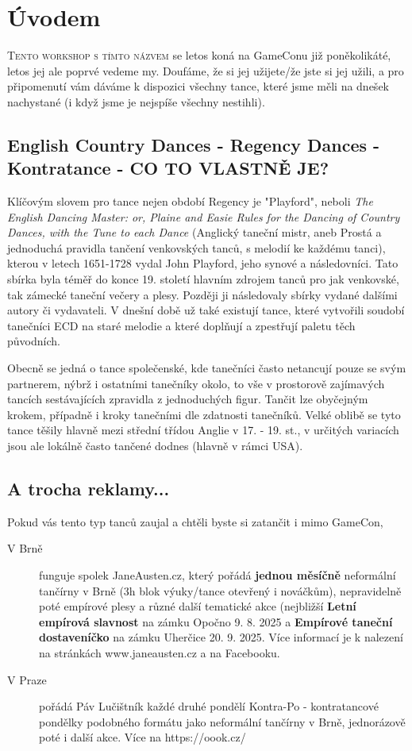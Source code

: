 \chapter{Úvodem}

\lettrine{T}{ento workshop s tímto názvem} se letos koná na GameConu již poněkolikáté, letos jej ale poprvé vedeme my. Doufáme, že si jej užijete/že jste si jej užili, a pro připomenutí vám dáváme k dispozici všechny tance, které jsme měli na dnešek nachystané (i když jsme je nejspíše všechny nestihli).

\section*{English Country Dances - Regency Dances - Kontratance - CO TO VLASTNĚ JE?}

Klíčovým slovem pro tance nejen období Regency je "Playford", neboli \textit{The English Dancing Master: or, Plaine and Easie Rules for the Dancing of Country Dances, with the Tune to each Dance} (Anglický taneční mistr, aneb Prostá a jednoduchá pravidla tančení venkovských tanců, s melodií ke každému tanci), kterou v letech 1651-1728 vydal John Playford, jeho synové a následovníci. Tato sbírka byla téměř do konce 19. století hlavním zdrojem tanců pro jak venkovské, tak zámecké taneční večery a plesy. Později ji následovaly sbírky vydané dalšími autory či vydavateli. V dnešní době už také existují tance, které vytvořili soudobí tanečníci ECD na staré melodie a které doplňují a  zpestřují paletu těch původních.

Obecně se jedná o tance společenské, kde tanečníci často netancují pouze se svým partnerem, nýbrž i ostatními tanečníky okolo, to vše v prostorově zajímavých tancích sestávajících zpravidla z jednoduchých figur. Tančit lze obyčejným krokem, případně i kroky tanečními dle zdatnosti tanečníků. Velké oblibě se tyto tance těšily hlavně mezi střední třídou Anglie v 17. - 19. st., v určitých variacích jsou ale lokálně často tančené dodnes (hlavně v rámci USA).

\section*{A trocha reklamy...}

Pokud vás tento typ tanců zaujal a chtěli byste si zatančit i mimo GameCon,
\begin{description}
    \item[V Brně] funguje spolek JaneAusten.cz, který pořádá \textbf{jednou měsíčně} neformální tančírny v Brně (3h blok výuky/tance otevřený i nováčkům), nepravidelně poté empírové plesy a různé další tematické akce (nejbližší \textbf{Letní empírová slavnost} na zámku Opočno 9. 8. 2025 a \textbf{Empírové taneční dostaveníčko} na zámku Uherčice 20. 9. 2025. Více informací je k nalezení na stránkách www.janeausten.cz a na Facebooku.
    \item[V Praze] pořádá Páv Lučištník každé druhé pondělí Kontra-Po - kontratancové pondělky podobného formátu jako neformální tančírny v Brně, jednorázově poté i další akce. Více na https://oook.cz/
\end{description}

